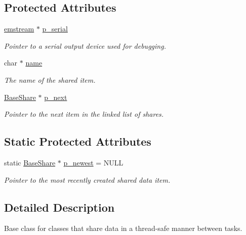 \subsection*{Protected Attributes}
\begin{DoxyCompactItemize}
\item 
\mbox{\hyperlink{classemstream}{emstream}} $\ast$ \mbox{\hyperlink{class_base_share_af9176a9e2d467ccc1fd05f84bce4f74a}{p\+\_\+serial}}
\begin{DoxyCompactList}\small\item\em Pointer to a serial output device used for debugging. \end{DoxyCompactList}\item 
char $\ast$ \mbox{\hyperlink{class_base_share_a3da759fb6f803ddb8e3883435d91d29a}{name}}
\begin{DoxyCompactList}\small\item\em The name of the shared item. \end{DoxyCompactList}\item 
\mbox{\hyperlink{class_base_share}{Base\+Share}} $\ast$ \mbox{\hyperlink{class_base_share_a8077022ea40c4ba44a6ff07ab24cac83}{p\+\_\+next}}
\begin{DoxyCompactList}\small\item\em Pointer to the next item in the linked list of shares. \end{DoxyCompactList}\end{DoxyCompactItemize}
\subsection*{Static Protected Attributes}
\begin{DoxyCompactItemize}
\item 
static \mbox{\hyperlink{class_base_share}{Base\+Share}} $\ast$ \mbox{\hyperlink{class_base_share_a0657d8a02509e79c3bb418aaa9cce33c}{p\+\_\+newest}} = N\+U\+LL
\begin{DoxyCompactList}\small\item\em Pointer to the most recently created shared data item. \end{DoxyCompactList}\end{DoxyCompactItemize}


\subsection{Detailed Description}
Base class for classes that share data in a thread-\/safe manner between tasks. 

